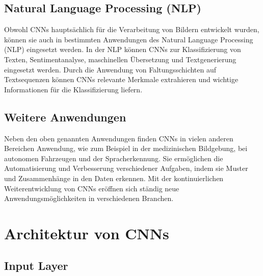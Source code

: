 \subsection{Natural Language Processing (NLP)}

	Obwohl CNNs hauptsächlich für die Verarbeitung von Bildern entwickelt wurden, können sie auch in bestimmten Anwendungen des Natural Language Processing (NLP) eingesetzt werden.
	In der NLP können CNNs zur Klassifizierung von Texten, Sentimentanalyse, maschinellen Übersetzung und Textgenerierung eingesetzt werden.
	Durch die Anwendung von Faltungsschichten auf Textsequenzen können CNNs relevante Merkmale extrahieren und wichtige Informationen für die Klassifizierung liefern.

\subsection{Weitere Anwendungen}

	Neben den oben genannten Anwendungen finden CNNs in vielen anderen Bereichen Anwendung, wie zum Beispiel in der medizinischen Bildgebung, bei autonomen Fahrzeugen und der Spracherkennung.
	Sie ermöglichen die Automatisierung und Verbesserung verschiedener Aufgaben, indem sie Muster und Zusammenhänge in den Daten erkennen.
	Mit der kontinuierlichen Weiterentwicklung von CNNs eröffnen sich ständig neue Anwendungsmöglichkeiten in verschiedenen Branchen.

\section{Architektur von CNNs}

\subsection{Input Layer}

